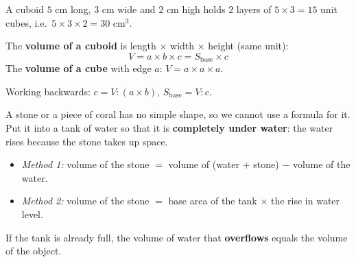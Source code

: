 \begin{knowbox}
\begin{minipage}[t]{0.6\linewidth}
A cuboid $5$ cm long, $3$ cm wide and $2$ cm high holds $2$ layers of $5\times3=15$ unit cubes, i.e.\ $5\times3\times2=30$ cm$^3$.\par
\smallskip
The \textbf{volume of a cuboid} is length $\times$ width $\times$ height (same unit):
\[V=a\times b\times c=S_{\text{base}}\times c\]
The \textbf{volume of a cube} with edge $a$: \quad $V=a\times a\times a$.\par
\smallskip
Working backwards: \quad $c=V:(a\times b)$, \quad $S_{\text{base}}=V:c$.
\end{minipage}\hfill
\begin{minipage}[t]{0.36\linewidth}\vspace{6pt}\centering
{}
\end{minipage}
\end{knowbox}
\begin{knowbox}
A stone or a piece of coral has no simple shape, so we cannot use a formula for it. Put it into a tank of water so that it is \textbf{completely under water}: the water rises because the stone takes up space.
\begin{itemize}[leftmargin=1.2em,itemsep=1pt,topsep=2pt]
\item \emph{Method 1:} volume of the stone $=$ volume of (water $+$ stone) $-$ volume of the water.
\item \emph{Method 2:} volume of the stone $=$ base area of the tank $\times$ the rise in water level.
\end{itemize}
If the tank is already full, the volume of water that \textbf{overflows} equals the volume of the object.
\end{knowbox}
\gap
